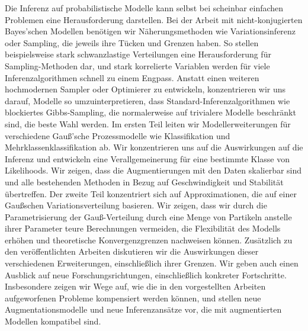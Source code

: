 
\begin{zusammenfassung}        %
Die Inferenz auf probabilistische Modelle kann selbst bei scheinbar einfachen Problemen eine Herausforderung darstellen.
Bei der Arbeit mit nicht-konjugierten Bayes'schen Modellen benötigen wir Näherungsmethoden wie Variationsinferenz oder Sampling, die jeweils ihre Tücken und Grenzen haben.
So stellen beispielsweise stark schwanzlastige Verteilungen eine Herausforderung für Sampling-Methoden dar, und stark korrelierte Variablen werden für viele Inferenzalgorithmen schnell zu einem Engpass.
Anstatt einen weiteren hochmodernen Sampler oder Optimierer zu entwickeln, konzentrieren wir uns darauf, Modelle so umzuinterpretieren, dass Standard-Inferenzalgorithmen wie blockiertes Gibbs-Sampling, die normalerweise auf trivialere Modelle beschränkt sind, die beste Wahl werden.
Im ersten Teil leiten wir Modellerweiterungen für verschiedene Gauß'sche Prozessmodelle wie Klassifikation und Mehrklassenklassifikation ab.
Wir konzentrieren uns auf die Auswirkungen auf die Inferenz und entwickeln eine Verallgemeinerung für eine bestimmte Klasse von Likelihoods.
Wir zeigen, dass die Augmentierungen mit den Daten skalierbar sind und alle bestehenden Methoden in Bezug auf Geschwindigkeit und Stabilität übertreffen.
Der zweite Teil konzentriert sich auf Approximationen, die auf einer Gaußschen Variationsverteilung basieren.
Wir zeigen, dass wir durch die Parametrisierung der Gauß-Verteilung durch eine Menge von Partikeln anstelle ihrer Parameter teure Berechnungen vermeiden, die Flexibilität des Modells erhöhen und theoretische Konvergenzgrenzen nachweisen können.
Zusätzlich zu den veröffentlichten Arbeiten diskutieren wir die Auswirkungen dieser verschiedenen Erweiterungen, einschließlich ihrer Grenzen.
Wir geben auch einen Ausblick auf neue Forschungsrichtungen, einschließlich konkreter Fortschritte.
Insbesondere zeigen wir Wege auf, wie die in den vorgestellten Arbeiten aufgeworfenen Probleme kompensiert werden können, und stellen neue Augmentationsmodelle und neue Inferenzansätze vor, die mit augmentierten Modellen kompatibel sind.
\end{zusammenfassung}
\ifCLASSINFOlangDE
{}
\else
{}
\fi
